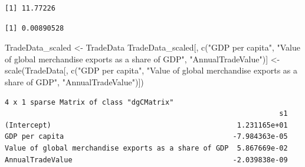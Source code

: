 \documentclass[
  10pt,
]{article}
\newenvironment{Shaded}{\begin{snugshade}}{\end{snugshade}}
\newcommand{\AttributeTok}[1]{\textcolor[rgb]{0.40,0.45,0.13}{#1}}
\newcommand{\FunctionTok}[1]{\textcolor[rgb]{0.28,0.35,0.67}{#1}}
\newcommand{\NormalTok}[1]{\textcolor[rgb]{0.00,0.23,0.31}{#1}}
\newcommand{\OtherTok}[1]{\textcolor[rgb]{0.00,0.23,0.31}{#1}}
\newcommand{\SpecialCharTok}[1]{\textcolor[rgb]{0.37,0.37,0.37}{#1}}
\newcommand{\StringTok}[1]{\textcolor[rgb]{0.13,0.47,0.30}{#1}}
\begin{document}
\begin{verbatim}
[1] 11.77226
\end{verbatim}

\begin{Shaded}
\end{Shaded}

\begin{verbatim}
[1] 0.00890528
\end{verbatim}

\begin{Shaded}
\begin{Highlighting}[]
\NormalTok{TradeData\_scaled }\OtherTok{\textless{}{-}}\NormalTok{ TradeData}
\NormalTok{TradeData\_scaled[, }\FunctionTok{c}\NormalTok{(}\StringTok{"GDP per capita"}\NormalTok{, }\StringTok{"Value of global merchandise exports as a share of GDP"}\NormalTok{, }\StringTok{"AnnualTradeValue"}\NormalTok{)] }\OtherTok{\textless{}{-}} \FunctionTok{scale}\NormalTok{(TradeData[, }\FunctionTok{c}\NormalTok{(}\StringTok{"GDP per capita"}\NormalTok{, }\StringTok{"Value of global merchandise exports as a share of GDP"}\NormalTok{, }\StringTok{"AnnualTradeValue"}\NormalTok{)])}
\end{Highlighting}
\end{Shaded}

\begin{Shaded}
\end{Shaded}

\begin{verbatim}
4 x 1 sparse Matrix of class "dgCMatrix"
                                                                 s1
(Intercept)                                            1.231165e+01
GDP per capita                                        -7.984363e-05
Value of global merchandise exports as a share of GDP  5.867669e-02
AnnualTradeValue                                      -2.039838e-09
\end{verbatim}

\begin{Shaded}
\end{Shaded}
\end{document}
